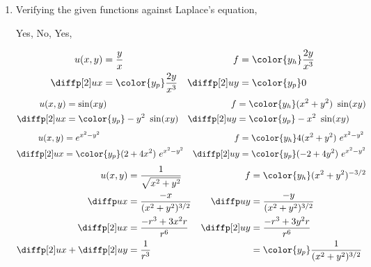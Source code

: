 \begin{enumerate}
\begin{enumerate}
              \item Verifying the given functions against Laplace's equation, \par
                    \textcolor{y_h}{Yes}, \textcolor{y_p}{No}, \textcolor{y_h}{Yes},

                    \begin{align}
                        u(x, y)      & = \frac{y}{x}                &
                        f            & = \color{y_h} \frac{2y}{x^3}   \\
                        \diffp[2] ux & = \color{y_p} \frac{2y}{x^3} &
                        \diffp[2] uy & = \color{y_p} 0
                    \end{align}
                    \begin{align}
                        u(x, y)      & = \sin(xy)                          &
                        f            & = \color{y_h} (x^2 + y^2)\ \sin(xy)   \\
                        \diffp[2] ux & = \color{y_p} -y^2\ \sin(xy)        &
                        \diffp[2] uy & = \color{y_p} -x^2\ \sin(xy)
                    \end{align}
                    \begin{align}
                        u(x, y)      & = e^{x^2 - y^2}                           &
                        f            & = \color{y_h} 4(x^2 + y^2)\ e^{x^2 - y^2}   \\
                        \diffp[2] ux & = \color{y_p} (2 + 4x^2)\ e^{x^2 - y^2}   &
                        \diffp[2] uy & = \color{y_p} (-2 + 4y^2)\ e^{x^2 - y^2}
                    \end{align}
                    \begin{align}
                        u(x, y)        & = \frac{1}{\sqrt{x^2 + y^2}}              &
                        f              & = \color{y_h} (x^2 + y^2)^{-3/2}            \\
                        \diffp ux      & = \frac{-x}{(x^2 + y^2)^{3/2}}            &
                        \diffp uy      & = \frac{-y}{(x^2 + y^2)^{3/2}}              \\
                        \diffp[2] ux   & = \frac{-r^3 + 3x^2 r}{r^6}               &
                        \diffp[2] uy   & = \frac{-r^3 + 3y^2 r}{r^6}                 \\
                        \diffp[2] ux
                        + \diffp[2] uy & = \frac{1}{r^3}                           &
                                       & = \color{y_p} \frac{1}{(x^2 + y^2)^{3/2}}
                    \end{align}


\end{enumerate}
\end{enumerate}
